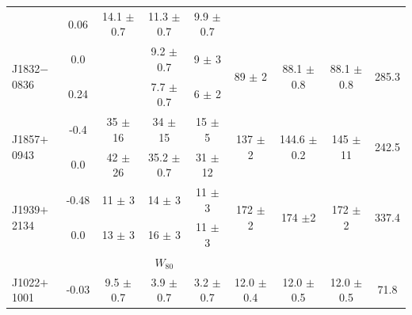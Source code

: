\documentclass[useAMS,usenatbib]{mn2e}
\begin{document}
\begin{table}
\begin{center}
\begin{tabular}{lcccccccc}
                              & 0.06  &14.1 $\pm$ 0.7   & 11.3 $\pm$ 0.7   &9.9 $\pm$ 0.7   &                                 &                                  &                                   &                          \\ 
\multirow{2}{*}{J1832$-$0836} & 0.0   &                 &  9.2 $\pm$ 0.7   &  9 $\pm$ 3     & \multirow{2}{*}{  89 $\pm$ 2  } & \multirow{2}{*}{88.1  $\pm $0.8 }& \multirow{2}{*}{88.1 $\pm$ 0.8}   &  \multirow{2}{*}{285.3}  \\
                              & 0.24  &                 &  7.7 $\pm$ 0.7   &  6 $\pm$ 2     &                                 &                                  &                                   &                          \\ 
\multirow{2}{*}{J1857$+$0943} & -0.4  &  35 $\pm$ 16    &   34 $\pm$ 15    & 15 $\pm$ 5     & \multirow{2}{*}{ 137 $\pm$ 2  } & \multirow{2}{*}{144.6 $\pm $0.2} & \multirow{2}{*}{ 145 $\pm$ 11  }  &  \multirow{2}{*}{242.5}  \\
                              & 0.0   &  42 $\pm$ 26    & 35.2 $\pm$ 0.7   & 31 $\pm$ 12    &                                 &                                  &                                   &                          \\ 
\multirow{2}{*}{J1939$+$2134} & -0.48 &  11 $\pm$ 3     &   14 $\pm$ 3     & 11 $\pm$ 3     & \multirow{2}{*}{ 172 $\pm$ 2  } & \multirow{2}{*}{174   $\pm $2   }& \multirow{2}{*}{ 172 $\pm$ 2   }  &  \multirow{2}{*}{337.4}  \\
                              & 0.0   &  13 $\pm$ 3     &   16 $\pm$ 3     & 11 $\pm$ 3     &                                 &                                  &                                   &                          \\ 
\hline                                                                                                         
\hline                                                                                                         
            &             &          & $W_{80}$ &          &         &       &     &    \\
\hline                                                                                                         
\multirow{2}{*}{J1022$+$1001} & -0.03 &  9.5 $\pm$ 0.7  & 3.9 $\pm$ 0.7  & 3.2 $\pm$ 0.7    & \multirow{2}{*}{12.0 $\pm$ 0.4} & \multirow{2}{*}{12.0 $\pm$ 0.5 }& \multirow{2}{*}{12.0 $\pm$ 0.5}   &  \multirow{2}{*}{71.8 }  \\

\end{tabular}
\end{center}
\end{table}
\end{document}
